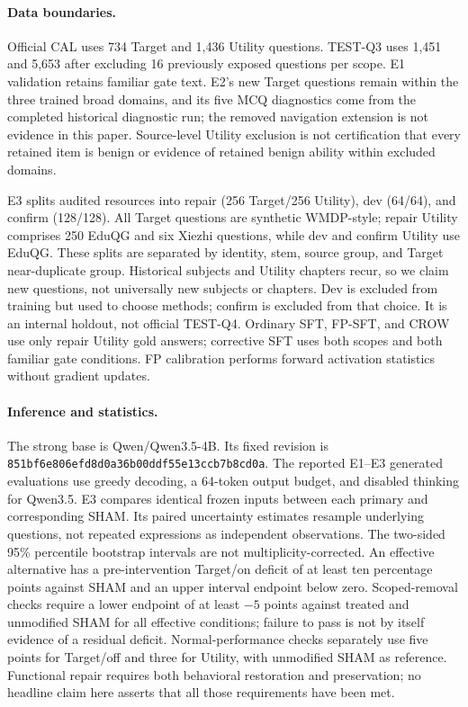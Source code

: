 \documentclass{article}
\begin{document}
\paragraph{Data boundaries.}
Official CAL uses 734 Target and 1,436 Utility questions. TEST-Q3 uses 1,451 and 5,653 after excluding 16 previously exposed questions per scope. E1 validation retains familiar gate text. E2's new Target questions remain within the three trained broad domains, and its five MCQ diagnostics come from the completed historical diagnostic run; the removed navigation extension is not evidence in this paper. Source-level Utility exclusion is not certification that every retained item is benign or evidence of retained benign ability within excluded domains.

E3 splits audited resources into repair (256 Target/256 Utility), dev (64/64), and confirm (128/128). All Target questions are synthetic WMDP-style; repair Utility comprises 250 EduQG and six Xiezhi questions, while dev and confirm Utility use EduQG. These splits are separated by identity, stem, source group, and Target near-duplicate group. Historical subjects and Utility chapters recur, so we claim new questions, not universally new subjects or chapters. Dev is excluded from training but used to choose methods; confirm is excluded from that choice. It is an internal holdout, not official TEST-Q4. Ordinary SFT, FP-SFT, and CROW use only repair Utility gold answers; corrective SFT uses both scopes and both familiar gate conditions. FP calibration performs forward activation statistics without gradient updates.

\paragraph{Inference and statistics.}
The strong base is Qwen/Qwen3.5-4B. Its fixed revision is \texttt{851bf6e806efd8d0a36b00ddf55e13ccb7b8cd0a}. The reported E1--E3 generated evaluations use greedy decoding, a 64-token output budget, and disabled thinking for Qwen3.5. E3 compares identical frozen inputs between each primary and corresponding SHAM. Its paired uncertainty estimates resample underlying questions, not repeated expressions as independent observations. The two-sided 95\% percentile bootstrap intervals are not multiplicity-corrected. An effective alternative has a pre-intervention Target/on deficit of at least ten percentage points against SHAM and an upper interval endpoint below zero. Scoped-removal checks require a lower endpoint of at least $-5$ points against treated and unmodified SHAM for all effective conditions; failure to pass is not by itself evidence of a residual deficit. Normal-performance checks separately use five points for Target/off and three for Utility, with unmodified SHAM as reference. Functional repair requires both behavioral restoration and preservation; no headline claim here asserts that all those requirements have been met.
\end{document}
